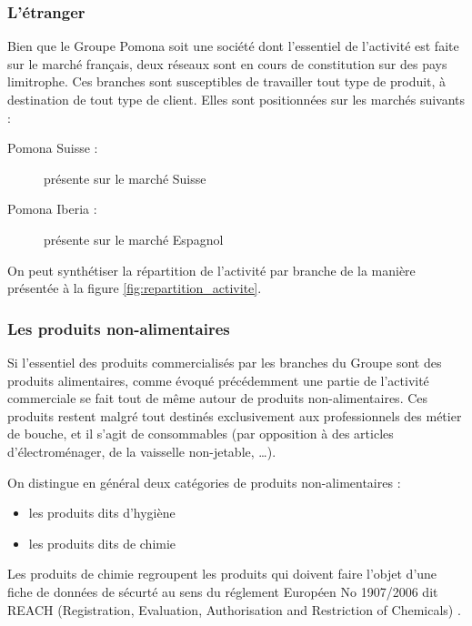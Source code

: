                 \subsubsection{L'étranger}

                Bien que le Groupe Pomona soit une société dont l'essentiel de l'activité est faite sur le marché français, deux réseaux sont en cours de constitution sur des pays limitrophe.
                Ces branches sont susceptibles de travailler tout type de produit, à destination de tout type de client.
                Elles sont positionnées sur les marchés suivants : 
                \begin{description}
                    \item[Pomona Suisse :] présente sur le marché Suisse
                    \item[Pomona Iberia :] présente sur le marché Espagnol 
                \end{description}

                On peut synthétiser la répartition de l'activité par branche de la manière présentée à la figure \ref{fig:repartition_activite}.

                \subsubsection{Les produits non-alimentaires}
                \label{produits_nonal}
                Si l'essentiel des produits commercialisés par les branches du Groupe sont des produits alimentaires, comme évoqué précédemment une partie de l'activité commerciale se fait tout de même autour de produits non-alimentaires.
                Ces produits restent malgré tout destinés exclusivement aux professionnels des métier de bouche, et il s'agit de consommables (par opposition à des articles d'électroménager, de la vaisselle non-jetable, \dots).

                On distingue en général deux catégories de produits non-alimentaires : 
                \begin{itemize}
                    \item les produits dits \og d'hygiène \fg
                    \item les produits dits \og de chimie \fg
                \end{itemize}

                Les produits de chimie regroupent les produits qui doivent faire l'objet d'une fiche de données de sécurté au sens du réglement Européen No 1907/2006 dit \og REACH \fg (Registration, Evaluation, Authorisation and Restriction of Chemicals) \cite{reach_text}.

